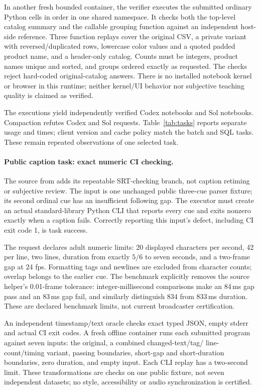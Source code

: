 In another fresh bounded container, the verifier executes the submitted
ordinary Python cells in order in one shared namespace. It checks both the
top-level catalog summary and the callable grouping function against an
independent host-side reference. Three function replays cover the original
CSV, a private variant with reversed/duplicated rows, lowercase color values
and a quoted padded product name, and a header-only catalog. Counts must be
integers, product names unique and sorted, and groups ordered exactly as
requested. The checks reject hard-coded original-catalog answers. There is
no installed notebook kernel or browser in this runtime; neither kernel/UI
behavior nor subjective teaching quality is claimed as verified.

The \NotebookExecutions{} executions yield \NotebookCodexAchieved{}
independently verified Codex notebooks and \NotebookSolAchieved{} Sol
notebooks. Compaction refutes \NotebookCodexRefuted{} Codex and
\NotebookSolRefuted{} Sol requests. Table~\ref{tab:tasks} reports
separate usage and times; client version and cache policy match the batch
and SQL tasks. These remain repeated observations of one selected task.

\paragraph{Public caption task: exact numeric CI checking.}
The  source from  adds its
repeatable SRT-checking branch, not caption retiming or subjective review.
The input is one unchanged public three-cue parser fixture; its second
ordinal cue has an insufficient following gap. The executor must create
an actual standard-library Python CLI that reports every cue and exits
nonzero exactly when a caption fails. Correctly reporting this input's
defect, including CI exit code 1, is task success.

The request declares adult numeric limits: 20 displayed characters per
second, 42 per line, two lines, duration from exactly $5/6$ to seven
seconds, and a two-frame gap at 24 fps. Formatting tags and newlines are
excluded from character counts; overlap belongs to the earlier cue.
The benchmark explicitly removes the source helper's 0.01-frame tolerance:
integer-millisecond comparisons make an 84\,ms gap pass and an 83\,ms gap
fail, and similarly distinguish 834 from 833\,ms duration.
These are declared benchmark limits, not current broadcaster certification.

An independent timestamp/text oracle checks exact typed JSON, empty stderr
and actual CI exit codes. A fresh offline container runs each submitted
program against seven inputs: the original, a combined changed-text/tag/
line-count/timing variant, passing boundaries, short-gap and short-duration
boundaries, zero duration, and empty input. Each CLI replay has a two-second
limit. These transformations are checks on one public fixture, not seven
independent datasets; no style, accessibility or audio synchronization is
certified.

